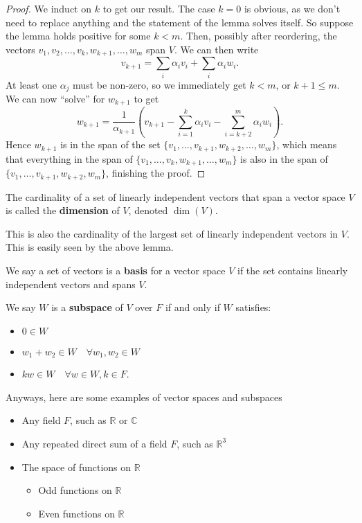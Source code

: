 \begin{proof}
We induct on $k$ to get our result. The case $k = 0$ is obvious, as we
don't need to replace anything and the statement of the lemma solves
itself. So suppose the lemma holds positive for some $k < m$. Then,
possibly after reordering, the vectors $v_1, v_2, \dots, v_k, w_{k + 1},
\dots, w_m$ span $V$. We can then write
\[ v_{k + 1} = \sum_i \alpha_i v_i + \sum_i \alpha_i w_i. \]
At least one $\alpha_j$ must be non-zero, so we immediately get $k < m$,
or $k + 1 \leq m$. We can now ``solve'' for $w_{k + 1}$ to get
\[ w_{k + 1} = \frac{1}{\alpha_{k + 1}} \left(v_{k + 1} - \sum_{i =
1}^{k} \alpha_i v_i - \sum_{i = k + 2}^{m} \alpha_i w_i\right). \]
Hence $w_{k + 1}$ is in the span of the set $\lbrace v_1, \dots, v_{k +
1}, w_{k + 2}, \dots, w_m \rbrace$, which means that everything in the
span of $\lbrace v_1, \dots, v_k, w_{k + 1}, \dots, w_m \rbrace$ is also
in the span of $\lbrace v_1, \dots, v_{k + 1}, w_{k + 2}, w_m \rbrace$,
finishing the proof.
\end{proof}

\begin{df}
The cardinality of a set of linearly independent vectors that span a
vector space $V$ is called the \textbf{dimension} of $V$, denoted
$\dim(V)$.

This is also the cardinality of the largest set of linearly independent
vectors in $V$. This is easily seen by the above lemma.
\end{df}

\begin{df}
We say a set of vectors is a \textbf{basis} for a vector space $V$ if
the set contains linearly independent vectors and spans $V$.
\end{df}

\begin{df}
We say $W$ is a \textbf{subspace} of $V$ over $F$ if and only if $W$
satisfies:
\begin{itemize}
\item $0 \in W$
\item $w_1 + w_2 \in W \quad \forall w_1, w_2 \in W$
\item $k w \in W \quad \forall w \in W, k \in F$.
\end{itemize}
\end{df}

Anyways, here are some examples of vector spaces and subspaces
\begin{itemize}
\item Any field $F$, such as $\mathbb{R}$ or $\mathbb{C}$
\item Any repeated direct sum of a field $F$, such as $\mathbb{R}^3$
\item The space of functions on $\mathbb{R}$
\begin{itemize}
\item Odd functions on $\mathbb{R}$
\item Even functions on $\mathbb{R}$
\end{itemize}
\end{itemize}

